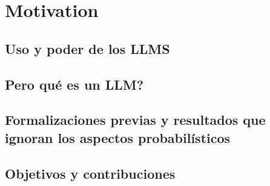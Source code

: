 \chapter{Motivation}

\section{Uso y poder de los LLMS}


\section{Pero qué es un LLM?}


\section{Formalizaciones previas y resultados que ignoran los aspectos probabilísticos}


\section{Objetivos y contribuciones}

